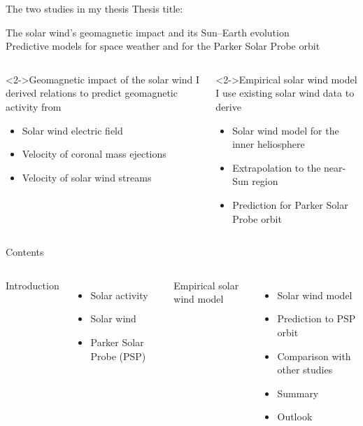 \frame[plain]{\titlepage}

\begin{frame}[plain,c]{The two studies in my thesis}{}
	Thesis title:
	\begin{block}{}
		\color{blue} \centering \Large The solar wind's geomagnetic impact and its Sun–Earth evolution\\
		\large Predictive models for space weather and for the Parker Solar Probe orbit
	\end{block}
	
	\begin{columns}[t]
		
		\begin{block}<2->{Geomagnetic impact of the solar wind}
			I derived relations to predict geomagnetic activity from
			\begin{itemize}
				\item Solar wind electric field
				\item Velocity of coronal mass ejections
				\item Velocity of solar wind streams
			\end{itemize}
		\end{block}
		
		
		\begin{block}<2->{Empirical solar wind model}
			I use existing solar wind data to derive
			\begin{itemize}
				\item Solar wind model for the inner heliosphere
				\item Extrapolation to the near-Sun region
				\item Prediction for Parker Solar Probe orbit
			\end{itemize}
		\end{block}
	
	\end{columns}
\end{frame}

\begin{frame}[c]{Contents}{}
	\begin{columns}[c]

		
		\large Introduction
		\begin{itemize}
			\item Solar activity
			\item Solar wind
			\item Parker Solar Probe (PSP)
		\end{itemize}
		\large Empirical solar wind model
		\begin{itemize}
			\item Solar wind model
			\item Prediction to PSP orbit
			\item Comparison with other studies
			\item Summary
			\item Outlook
		\end{itemize}
		
	\end{columns}
\end{frame}

